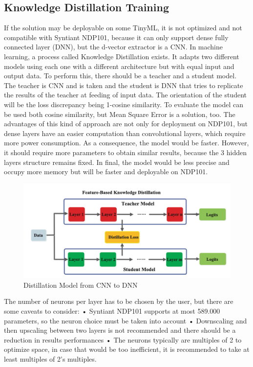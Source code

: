\subsection{Knowledge Distillation Training}
\label{subsec:knowledge distillation training}
If the solution may be deployable on some TinyML, it is not optimized and not compatible with Syntiant NDP101, because it can only support dense fully connected layer (DNN), but the d-vector extractor is a CNN\cite{distillation_from_cnn_to_dnn}\cite{knowledge_distillation}. In machine learning, a process called Knowledge Distillation exists. It adapts two different models using each one with a different architecture but with equal input and output data. To perform this, there should be a teacher and a student model. The teacher is CNN and is taken and the student is DNN that tries to replicate the results of the teacher at feeding of input data. The orientation of the student will be the loss discrepancy being 1-cosine similarity. To evaluate the model can be used both cosine similarity, but Mean Square Error is a solution, too. The advantages of this kind of approach are not only for deployment on NDP101, but dense layers have an easier computation than convolutional layers, which require more power consumption. As a consequence, the model would be faster. However, it should require more parameters to obtain similar results, because the 3 hidden layers structure remains fixed. In final, the model would be less precise and occupy more memory but will be faster and deployable on NDP101.
\begin{center}
\begin{figure}[!h]
        \centering
        \includegraphics[width=1.0\textwidth]{images/3.03 Distillation Technique.png}
        \caption{Distillation Model from CNN to DNN}
    \end{figure}
\end{center}
The number of neurons per layer has to be chosen by the user, but there are some caveats to consider:\newline
• Syntiant NDP101 supports at most 589.000 parameters, so the neuron choice must be taken into account\newline
• Downscaling and then upscaling between two layers is not recommended and there should be a reduction in results performances\newline
• The neurons typically are multiples of 2 to optimize space, in case that would be too inefficient, it is recommended to take at least multiples of 2's multiples.\newline
